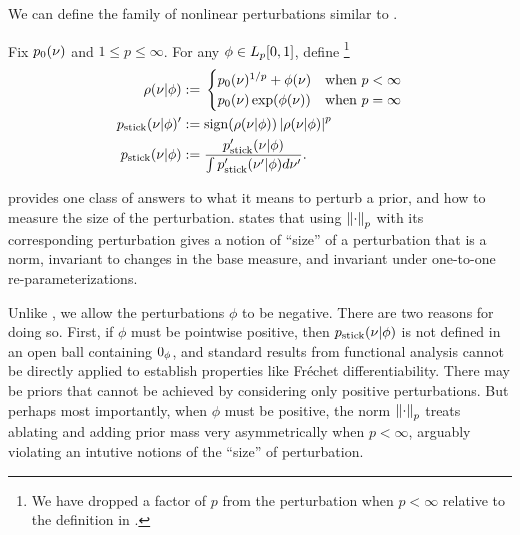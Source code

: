 We can define the family of nonlinear perturbations similar to
\citep{gustafson:1996:local}.

\begin{defn}
%
Fix $p_{0}(\nu)$ and $1 \le p \le \infty$.  For any $\phi \in {L_{p}[0,1]}$, define
\footnote{We have dropped a factor of $p$ from the perturbation when $p <
\infty$ relative to the definition in \citep{gustafson:1996:local}.}
%
\begin{align*}
%
\rho(\nu \vert \phi) :={}& \begin{cases}
%
\pbase(\nu)^{1/p} + \phi(\nu)
    & \textrm{when }p < \infty \\
\pbase(\nu)\exp(\phi(\nu))
    & \textrm{when }p = \infty
%
\end{cases}\\
%
\pstick(\nu \vert \phi)' :={}&
    \mathrm{sign}(\rho(\nu \vert \phi)) \abs{\rho(\nu \vert \phi)}^p\\
\pstick(\nu \vert \phi) :={}&
    \frac{\pstick'(\nu \vert \phi)}{\int \pstick'(\nu' \vert \phi) d\nu'}.
%
\end{align*}
%
\end{defn}
%

 provides one class of answers to what it means to perturb
a prior, and how to measure the size of the perturbation.  \citep[Result
2]{gustafson:1996:local} states that using $\left\Vert\cdot\right\Vert_p$ with its
corresponding perturbation gives a notion of ``size'' of a perturbation that is
a norm, invariant to changes in the base measure, and invariant under one-to-one
re-parameterizations.

Unlike \citep{gustafson:1996:local}, we allow the perturbations $\phi$ to be
negative.  There are two reasons for doing so.  First, if $\phi$ must be
pointwise positive, then $p_{\mathrm{stick}}(\nu \vert \phi)$ is not defined in an open
ball containing $0_\phi$, and standard results from functional analysis cannot be
directly applied to establish properties like Fr{\'e}chet differentiability.
There may be priors that cannot be achieved by considering only positive
perturbations.  But perhaps most importantly, when $\phi$ must be positive, the
norm $\left\Vert\cdot\right\Vert_p$ treats ablating and adding prior mass very asymmetrically
when $p < \infty$, arguably violating an intutive notions of the ``size''
of perturbation.

